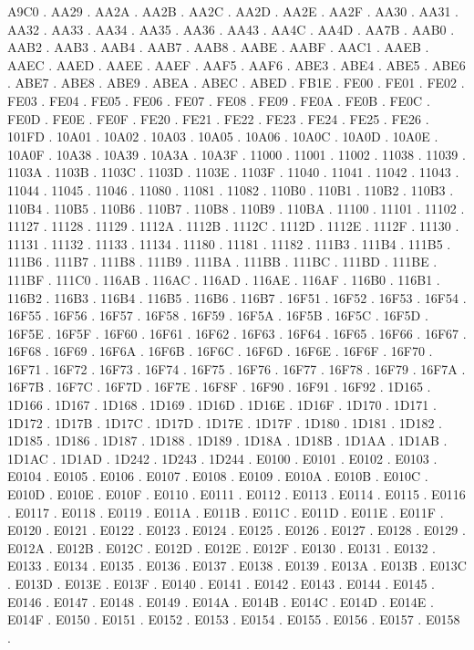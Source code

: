 A9C0 .
AA29 .
AA2A .
AA2B .
AA2C .
AA2D .
AA2E .
AA2F .
AA30 .
AA31 .
AA32 .
AA33 .
AA34 .
AA35 .
AA36 .
AA43 .
AA4C .
AA4D .
AA7B .
AAB0 .
AAB2 .
AAB3 .
AAB4 .
AAB7 .
AAB8 .
AABE .
AABF .
AAC1 .
AAEB .
AAEC .
AAED .
AAEE .
AAEF .
AAF5 .
AAF6 .
ABE3 .
ABE4 .
ABE5 .
ABE6 .
ABE7 .
ABE8 .
ABE9 .
ABEA .
ABEC .
ABED .
FB1E .
FE00 .
FE01 .
FE02 .
FE03 .
FE04 .
FE05 .
FE06 .
FE07 .
FE08 .
FE09 .
FE0A .
FE0B .
FE0C .
FE0D .
FE0E .
FE0F .
FE20 .
FE21 .
FE22 .
FE23 .
FE24 .
FE25 .
FE26 .
101FD .
10A01 .
10A02 .
10A03 .
10A05 .
10A06 .
10A0C .
10A0D .
10A0E .
10A0F .
10A38 .
10A39 .
10A3A .
10A3F .
11000 .
11001 .
11002 .
11038 .
11039 .
1103A .
1103B .
1103C .
1103D .
1103E .
1103F .
11040 .
11041 .
11042 .
11043 .
11044 .
11045 .
11046 .
11080 .
11081 .
11082 .
110B0 .
110B1 .
110B2 .
110B3 .
110B4 .
110B5 .
110B6 .
110B7 .
110B8 .
110B9 .
110BA .
11100 .
11101 .
11102 .
11127 .
11128 .
11129 .
1112A .
1112B .
1112C .
1112D .
1112E .
1112F .
11130 .
11131 .
11132 .
11133 .
11134 .
11180 .
11181 .
11182 .
111B3 .
111B4 .
111B5 .
111B6 .
111B7 .
111B8 .
111B9 .
111BA .
111BB .
111BC .
111BD .
111BE .
111BF .
111C0 .
116AB .
116AC .
116AD .
116AE .
116AF .
116B0 .
116B1 .
116B2 .
116B3 .
116B4 .
116B5 .
116B6 .
116B7 .
16F51 .
16F52 .
16F53 .
16F54 .
16F55 .
16F56 .
16F57 .
16F58 .
16F59 .
16F5A .
16F5B .
16F5C .
16F5D .
16F5E .
16F5F .
16F60 .
16F61 .
16F62 .
16F63 .
16F64 .
16F65 .
16F66 .
16F67 .
16F68 .
16F69 .
16F6A .
16F6B .
16F6C .
16F6D .
16F6E .
16F6F .
16F70 .
16F71 .
16F72 .
16F73 .
16F74 .
16F75 .
16F76 .
16F77 .
16F78 .
16F79 .
16F7A .
16F7B .
16F7C .
16F7D .
16F7E .
16F8F .
16F90 .
16F91 .
16F92 .
1D165 .
1D166 .
1D167 .
1D168 .
1D169 .
1D16D .
1D16E .
1D16F .
1D170 .
1D171 .
1D172 .
1D17B .
1D17C .
1D17D .
1D17E .
1D17F .
1D180 .
1D181 .
1D182 .
1D185 .
1D186 .
1D187 .
1D188 .
1D189 .
1D18A .
1D18B .
1D1AA .
1D1AB .
1D1AC .
1D1AD .
1D242 .
1D243 .
1D244 .
E0100 .
E0101 .
E0102 .
E0103 .
E0104 .
E0105 .
E0106 .
E0107 .
E0108 .
E0109 .
E010A .
E010B .
E010C .
E010D .
E010E .
E010F .
E0110 .
E0111 .
E0112 .
E0113 .
E0114 .
E0115 .
E0116 .
E0117 .
E0118 .
E0119 .
E011A .
E011B .
E011C .
E011D .
E011E .
E011F .
E0120 .
E0121 .
E0122 .
E0123 .
E0124 .
E0125 .
E0126 .
E0127 .
E0128 .
E0129 .
E012A .
E012B .
E012C .
E012D .
E012E .
E012F .
E0130 .
E0131 .
E0132 .
E0133 .
E0134 .
E0135 .
E0136 .
E0137 .
E0138 .
E0139 .
E013A .
E013B .
E013C .
E013D .
E013E .
E013F .
E0140 .
E0141 .
E0142 .
E0143 .
E0144 .
E0145 .
E0146 .
E0147 .
E0148 .
E0149 .
E014A .
E014B .
E014C .
E014D .
E014E .
E014F .
E0150 .
E0151 .
E0152 .
E0153 .
E0154 .
E0155 .
E0156 .
E0157 .
E0158 .

